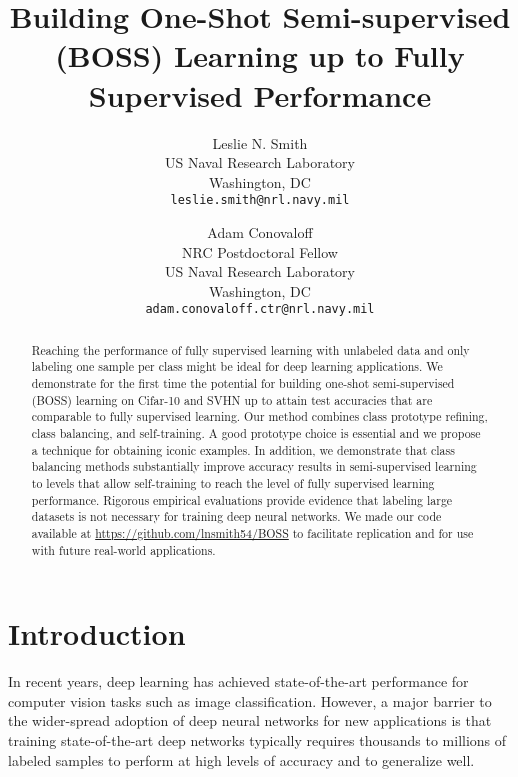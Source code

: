 \documentclass[final]{cvpr}
\newcommand{\SOTA}{state-of-the-art }
\begin{document}
\title{Building One-Shot Semi-supervised (BOSS) Learning up to Fully Supervised Performance}

\author{Leslie N. Smith\\
	US Naval Research Laboratory\\
	Washington, DC\\
{\tt\small leslie.smith@nrl.navy.mil}
\and
	Adam Conovaloff\\
NRC Postdoctoral Fellow\\
US Naval Research Laboratory\\
Washington, DC\\
{\tt\small adam.conovaloff.ctr@nrl.navy.mil}
}

\maketitle


\begin{abstract}
Reaching the performance of fully supervised learning with unlabeled data and only labeling one sample per class might be ideal for deep learning applications. We demonstrate for the first time the potential for building one-shot semi-supervised (BOSS) learning on Cifar-10 and SVHN up to attain test accuracies that are comparable to fully supervised learning.  Our method combines class prototype refining, class balancing, and self-training. A good prototype choice is essential and we propose a technique for obtaining iconic examples. In addition, we demonstrate that class balancing methods substantially improve accuracy results in semi-supervised learning to levels that allow self-training to reach the level of fully supervised learning performance.  Rigorous empirical evaluations provide evidence that labeling large datasets is not necessary for training deep neural networks.  
We made our code available at \url{https://github.com/lnsmith54/BOSS} to facilitate replication and for use with future real-world applications.
\end{abstract}

\section{Introduction}

In recent years, deep learning has achieved \SOTA performance for computer vision tasks such as image classification.
However, a major barrier to the wider-spread adoption of deep neural networks for new applications is that training \SOTA deep networks typically requires thousands to millions of labeled samples to perform at high levels of accuracy and to generalize well.
\end{document}
